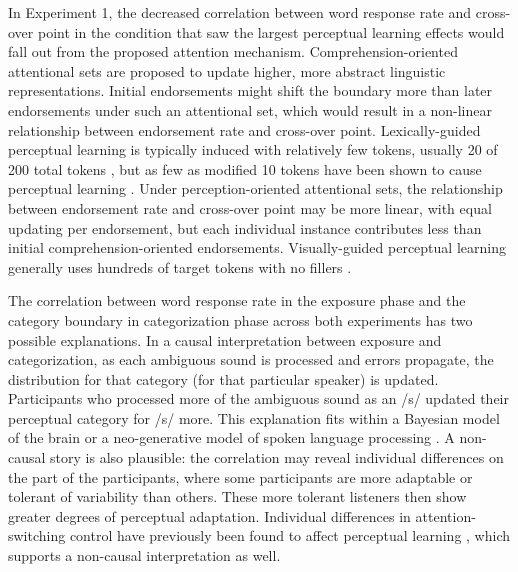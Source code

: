 In Experiment 1, the decreased correlation between word response rate and cross-over point in the condition that saw the largest perceptual learning effects would fall out from the proposed attention mechanism.
Comprehension-oriented attentional sets are proposed to update higher, more abstract linguistic representations.
Initial endorsements might shift the boundary more than later endorsements under such an attentional set, which would result in a non-linear relationship between endorsement rate and cross-over point.
Lexically-guided perceptual learning is typically induced with relatively few tokens, usually 20 of 200 total tokens \citep{Norris2003, Reinisch2013}, but as few as modified 10 tokens have been shown to cause perceptual learning \citep{Kraljic2008}.
Under perception-oriented attentional sets, the relationship between endorsement rate and cross-over point may be more linear, with equal updating per endorsement, but each individual instance contributes less than initial comprehension-oriented endorsements.
Visually-guided perceptual learning generally uses hundreds of target tokens with no fillers \citep{Vroomen2007, Reinisch2014}.

The correlation between word response rate in the exposure phase and the category boundary in categorization phase across both experiments has two possible explanations. 
In a causal interpretation between exposure and categorization, as each ambiguous sound is processed and errors propagate, the distribution for that category (for that particular speaker) is updated.
Participants who processed more of the ambiguous sound as an /s/ updated their perceptual category for /s/ more. 
This explanation fits within a Bayesian model of the brain \citep{Clark2013} or a neo-generative model of spoken language processing \citep{Pierrehumbert2002}.  
A non-causal story is also plausible:  the correlation may reveal individual differences on the part of the participants, where some participants are more adaptable or tolerant of variability than others.
These more tolerant listeners then show greater degrees of perceptual adaptation. 
Individual differences in attention-switching control have previously been found to affect perceptual learning \citep{Scharenborg2014}, which supports a non-causal interpretation as well.

